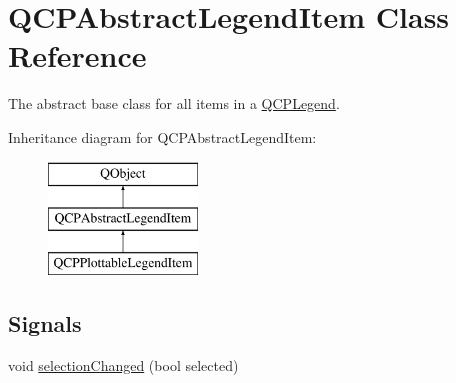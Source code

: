 \hypertarget{classQCPAbstractLegendItem}{\section{Q\-C\-P\-Abstract\-Legend\-Item Class Reference}
\label{classQCPAbstractLegendItem}
}


The abstract base class for all items in a \hyperlink{classQCPLegend}{Q\-C\-P\-Legend}.  


Inheritance diagram for Q\-C\-P\-Abstract\-Legend\-Item\-:\begin{figure}[H]
\begin{center}
\leavevmode
\includegraphics[height=3.000000cm]{classQCPAbstractLegendItem}
\end{center}
\end{figure}
\subsection*{Signals}
\begin{DoxyCompactItemize}
\item 
void \hyperlink{classQCPAbstractLegendItem_a7cb61fdfbaf69c590bacb8f9e7099d9e}{selection\-Changed} (bool selected)
\end{DoxyCompactItemize}
